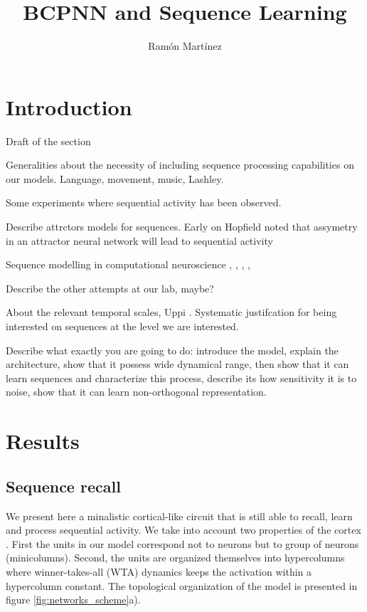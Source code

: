 \documentclass[10pt,a4paper]{article}
\author{Ram\'on Mart\'inez}
\title{BCPNN and Sequence Learning}
\begin{document}
\maketitle

\section{Introduction}
Draft of the section

Generalities about the necessity of including sequence processing capabilities on our models. Language, movement, music, Lashley.

Some experiments where sequential activity has been observed.

Describe attrctors models for sequences. Early on Hopfield noted that assymetry in an attractor neural network will lead to sequential activity \cite{hopfield1982neural} \cite{hopfield1984neurons} \cite{amari1972learning}  \cite{kleinfeld1986sequential} \cite{sompolinsky1986temporal} \cite{amit1992modeling}

Sequence modelling in computational neuroscience \cite{veliz2015networks}, \cite{fiete2010spike},
 \cite{murray2017learning} \cite{verduzco2012model}, \cite{wang2017model}, 

Describe the other attempts at our lab, maybe?

About the relevant temporal scales, Uppi \cite{bhalla2017dendrites}. Systematic justifcation for being interested on sequences at the level we are interested. 

Describe what exactly you are going to do: introduce the model, explain the architecture, show that it possess wide dynamical range, then show that it can learn sequences and characterize this process, describe its how sensitivity it is to noise, show that it can learn non-orthogonal representation. 


\section{Results}
\subsection{Sequence recall}

We present here a minalistic cortical-like circuit that is still able to recall, learn and process sequential activity. We take into account two properties of the cortex \cite{douglas2004neuronal}. First the units in our model correspond not to neurons but to group of neurons (minicolumns). Second, the units are organized themselves into hypercolumns where winner-takes-all (WTA) dynamics keeps the activation within a hypercolumn constant. The topological organization of the model is presented in figure \ref{fig:networks_scheme}a). 
\end{document}
